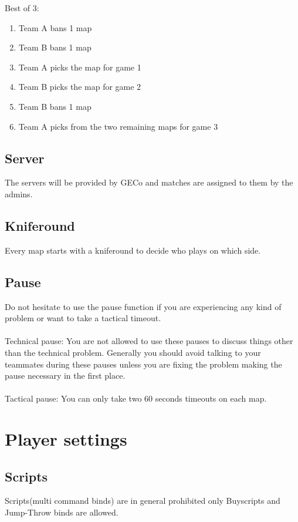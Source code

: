 \documentclass{article}
\begin{document}
Best of 3:
\begin{enumerate}
\item Team A bans 1 map
\item Team B bans 1 map
\item Team A picks the map for game 1
\item Team B picks the map for game 2
\item Team B bans 1 map
\item Team A picks from the two remaining maps for game 3
\end{enumerate}

\subsection{Server}
The servers will be provided by GECo and matches are assigned to them by the admins.\\

\subsection{Kniferound}
Every map starts with a kniferound to decide who plays on which side.


\subsection{Pause}
\label{sec:pause}
Do not hesitate to use the pause function if you are experiencing any kind of problem or want to take a tactical timeout.\\
\\Technical pause: You are not allowed to use these pauses to discuss things other than the technical problem. Generally you should avoid talking to your teammates during these pauses unless you are fixing the problem making the pause necessary in the first place.\\
\\Tactical pause: You can only take two 60 seconds timeouts on each map.



\section{Player settings}

\subsection{Scripts}
Scripts(multi command binds) are in general prohibited only Buyscripts and Jump-Throw binds are allowed.
\end{document}
